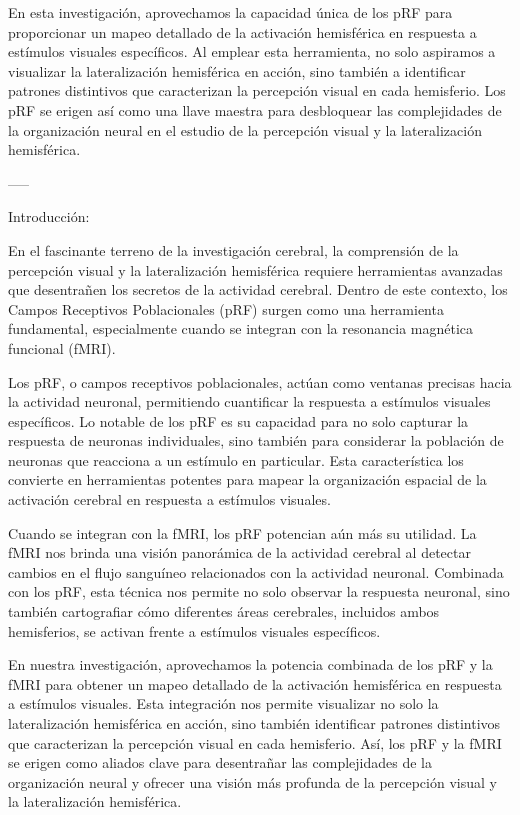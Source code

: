 \documentclass{article}
\begin{document}
	En esta investigación, aprovechamos la capacidad única de los pRF para proporcionar un mapeo detallado de la activación hemisférica en respuesta a estímulos visuales específicos. Al emplear esta herramienta, no solo aspiramos a visualizar la lateralización hemisférica en acción, sino también a identificar patrones distintivos que caracterizan la percepción visual en cada hemisferio. Los pRF se erigen así como una llave maestra para desbloquear las complejidades de la organización neural en el estudio de la percepción visual y la lateralización hemisférica.
	
	-----
	
	Introducción:
	
	En el fascinante terreno de la investigación cerebral, la comprensión de la percepción visual y la lateralización hemisférica requiere herramientas avanzadas que desentrañen los secretos de la actividad cerebral. Dentro de este contexto, los Campos Receptivos Poblacionales (pRF) surgen como una herramienta fundamental, especialmente cuando se integran con la resonancia magnética funcional (fMRI).
	
	Los pRF, o campos receptivos poblacionales, actúan como ventanas precisas hacia la actividad neuronal, permitiendo cuantificar la respuesta a estímulos visuales específicos. Lo notable de los pRF es su capacidad para no solo capturar la respuesta de neuronas individuales, sino también para considerar la población de neuronas que reacciona a un estímulo en particular. Esta característica los convierte en herramientas potentes para mapear la organización espacial de la activación cerebral en respuesta a estímulos visuales.
	
	Cuando se integran con la fMRI, los pRF potencian aún más su utilidad. La fMRI nos brinda una visión panorámica de la actividad cerebral al detectar cambios en el flujo sanguíneo relacionados con la actividad neuronal. Combinada con los pRF, esta técnica nos permite no solo observar la respuesta neuronal, sino también cartografiar cómo diferentes áreas cerebrales, incluidos ambos hemisferios, se activan frente a estímulos visuales específicos.
	
	En nuestra investigación, aprovechamos la potencia combinada de los pRF y la fMRI para obtener un mapeo detallado de la activación hemisférica en respuesta a estímulos visuales. Esta integración nos permite visualizar no solo la lateralización hemisférica en acción, sino también identificar patrones distintivos que caracterizan la percepción visual en cada hemisferio. Así, los pRF y la fMRI se erigen como aliados clave para desentrañar las complejidades de la organización neural y ofrecer una visión más profunda de la percepción visual y la lateralización hemisférica.
	
\end{document}
